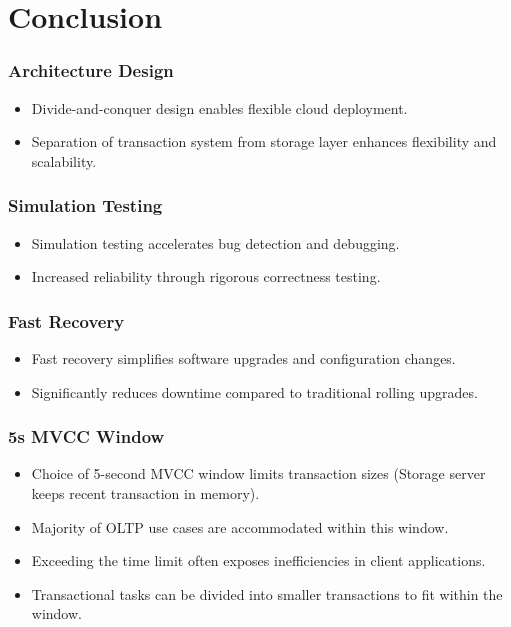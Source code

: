 \section{Conclusion}

\begin{frame}
    \frametitle{Architecture Design}
    \begin{itemize}
        \item Divide-and-conquer design enables flexible cloud deployment.
        \item Separation of transaction system from storage layer enhances flexibility and scalability.
    \end{itemize}
\end{frame}
\begin{frame}
    \frametitle{Simulation Testing}
    \begin{itemize}
        \item Simulation testing accelerates bug detection and debugging.
        \item Increased reliability through rigorous correctness testing.
    \end{itemize}
\end{frame}
\begin{frame}
    \frametitle{Fast Recovery}
    \begin{itemize}
        \item Fast recovery simplifies software upgrades and configuration changes.
        \item Significantly reduces downtime compared to traditional rolling upgrades.
    \end{itemize}
\end{frame}
\begin{frame}
    \frametitle{5s MVCC Window}
    \begin{itemize}
        \item Choice of 5-second MVCC window limits transaction sizes (Storage server keeps recent transaction in memory).
        \item Majority of OLTP use cases are accommodated within this window.
        \item Exceeding the time limit often exposes inefficiencies in client applications.
        \item Transactional tasks can be divided into smaller transactions to fit within the window.
    \end{itemize}
\end{frame}
